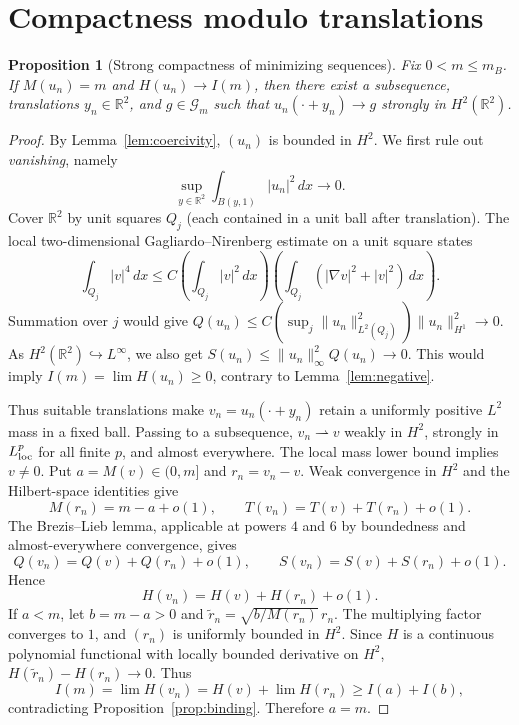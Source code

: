 \documentclass[11pt]{article}
\newtheorem{proposition}[theorem]{Proposition}
\newcommand{\RR}{\mathbb R}
\newcommand{\nm}[2]{\lVert #1\rVert_{#2}}
\newcommand{\GG}{\mathcal G}
\begin{document}
\section{Compactness modulo translations}
\begin{proposition}[Strong compactness of minimizing sequences]\label{prop:compact}
Fix \(0<m\le m_B\). If \(M(u_n)=m\) and \(H(u_n)\to I(m)\), then
there exist a subsequence, translations \(y_n\in\RR^2\), and
\(g\in\GG_m\) such that
\(u_n(\cdot+y_n)\to g\) strongly in \(H^2(\RR^2)\).
\end{proposition}
\begin{proof}
By Lemma~\ref{lem:coercivity}, \((u_n)\) is bounded in \(H^2\).
We first rule out \emph{vanishing}, namely
\[
\sup_{y\in\RR^2}\int_{B(y,1)}|u_n|^2\,dx\longrightarrow0.
\]
Cover \(\RR^2\) by unit squares \(Q_j\) (each contained in a unit
ball after translation). The local two-dimensional Gagliardo--Nirenberg
estimate on a unit square states
\[
\int_{Q_j}|v|^4\,dx\le C
\left(\int_{Q_j}|v|^2\,dx\right)
\left(\int_{Q_j}(|\nabla v|^2+|v|^2)\,dx\right).
\]
Summation over \(j\) would give
\(Q(u_n)\le C(\sup_j\nm{u_n}{L^2(Q_j)}^2)
\nm{u_n}{H^1}^2\to0\).
As \(H^2(\RR^2)\hookrightarrow L^\infty\), we also get
\(S(u_n)\le\nm{u_n}{\infty}^2Q(u_n)\to0\). This would imply
\(I(m)=\lim H(u_n)\ge0\), contrary to Lemma~\ref{lem:negative}.

Thus suitable translations make \(v_n=u_n(\cdot+y_n)\) retain a
uniformly positive \(L^2\) mass in a fixed ball. Passing to a subsequence,
\(v_n\rightharpoonup v\) weakly in \(H^2\), strongly in
\(L^p_{\rm loc}\) for all finite \(p\), and almost everywhere.
The local mass lower bound implies \(v\ne0\). Put \(a=M(v)\in(0,m]\)
and \(r_n=v_n-v\).
Weak convergence in \(H^2\) and the Hilbert-space identities give
\begin{equation}\label{eq:masssplit}
M(r_n)=m-a+o(1),\qquad
T(v_n)=T(v)+T(r_n)+o(1).
\end{equation}
The Brezis--Lieb lemma, applicable at powers \(4\) and \(6\) by boundedness
and almost-everywhere convergence, gives
\[
Q(v_n)=Q(v)+Q(r_n)+o(1),\qquad
S(v_n)=S(v)+S(r_n)+o(1).
\]
Hence
\begin{equation}\label{eq:energysplit}
H(v_n)=H(v)+H(r_n)+o(1).
\end{equation}
If \(a<m\), let \(b=m-a>0\) and
\(\widetilde r_n=\sqrt{b/M(r_n)}\,r_n\). The multiplying factor
converges to \(1\), and \((r_n)\) is uniformly bounded in \(H^2\).
Since \(H\) is a continuous polynomial functional with locally bounded
derivative on \(H^2\),
\(H(\widetilde r_n)-H(r_n)\to0\). Thus
\[
I(m)=\lim H(v_n)=H(v)+\lim H(r_n)
\ge I(a)+I(b),
\]
contradicting Proposition~\ref{prop:binding}.
Therefore \(a=m\).


\end{proof}
\end{document}
